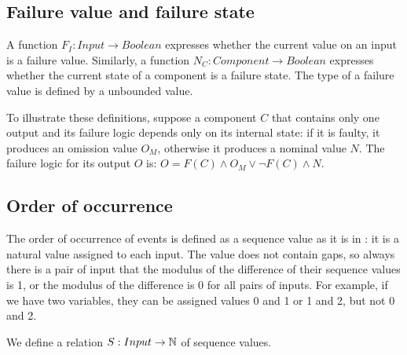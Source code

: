 \subsection{Failure value and failure state}

A function $F_I : Input \rightarrow Boolean$ expresses whether the current value on an input is a failure value. 
%
Similarly, a function $N_C : Component \rightarrow Boolean$ expresses whether the current state of a component is a failure state.
%
The type of a failure value is defined by a unbounded value.

To illustrate these definitions, suppose a component $C$ that contains only one output and its failure logic depends only on its internal state: if it is faulty, it produces an omission value $O_M$, otherwise it produces a nominal value $N$. 
%
The failure logic for its output $O$ is: $O = F(C) \land O_M \lor \lnot F(C) \land N$.

\subsection{Order of occurrence}

The order of occurrence of events is defined as a sequence value as it is in \HIPHOPS: it is a natural value assigned to each input.
%
The value does not contain gaps, so always there is a pair of input that the modulus of the difference of their sequence values is 1, or the modulus of the difference is 0 for all pairs of inputs.
%
For example, if we have two variables, they can be assigned values 0 and 1 or 1 and 2, but not 0 and 2. 

We define a relation $S : Input \rightarrow \mathbb{N} $ of sequence values.